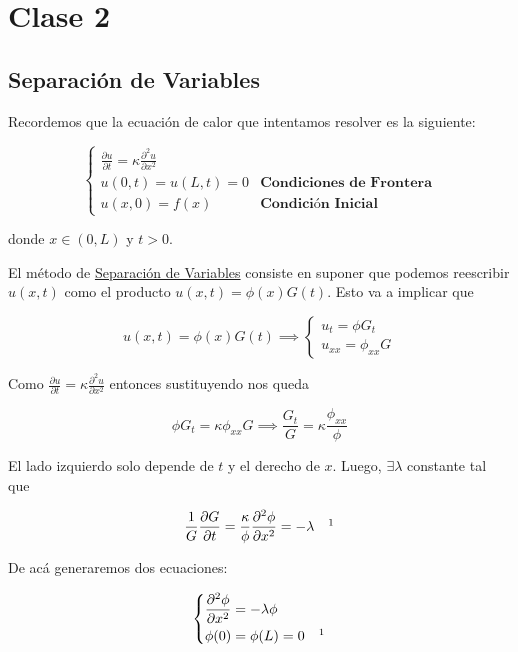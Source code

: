 \section{Clase 2}
\subsection{Separación de Variables}

Recordemos que la ecuación de calor que intentamos resolver es la siguiente:

\[
    \begin{cases*}
        \displaystyle\frac{\partial u}{\partial t} = \kappa \frac{\partial^2 u}{\partial x^2} & \\
        u(0, t) = u(L, t) = 0 & \textbf{Condiciones de Frontera} \\
        u(x, 0) = f(x) & \textbf{Condición Inicial}
    \end{cases*}    
\]

donde $x \in (0, L)$ y $t > 0$.

El método de \ul{Separación de Variables} consiste en suponer que podemos reescribir $u(x,t)$ como el producto $u(x,t) = \phi(x)G(t)$. Esto va a implicar que 

\[
    u(x,t) = \phi(x)G(t) \implies \begin{cases*}
                               u_t = \phi G_t \\
                               u_{xx} = \phi_{xx}G
                           \end{cases*}
\]

Como $\frac{\partial u}{\partial t} = \kappa \frac{\partial^2 u}{\partial x^2}$ entonces sustituyendo nos queda

\[
    \phi G_t = \kappa \phi_{xx}G \implies \displaystyle \frac{G_t}{G} = \kappa\frac{\phi_{xx}}{\phi}
\]

El lado izquierdo solo depende de $t$ y el derecho de $x$. Luego, $\exists \lambda$ constante tal que

\[
    \frac{1}{G} \frac{\partial G}{\partial t} = \frac{\kappa}{\phi}\frac{\partial^2 \phi}{\partial x^2} = -\lambda \quad \footnotemark
\]

De acá generaremos dos ecuaciones:

\begin{equation}\label{ec:separables1}
    \begin{cases*}
        \displaystyle\frac{\partial^2 \phi}{\partial x^2} = -\lambda \phi \\
        \phi(0) = \phi(L) = 0 \quad \footnotemark
    \end{cases*}
\end{equation}


